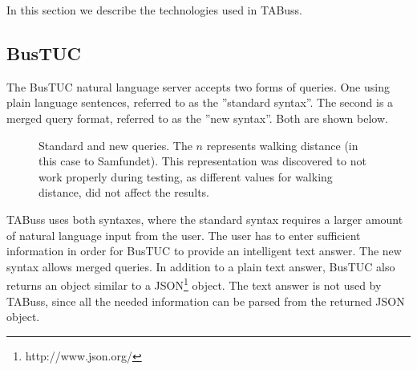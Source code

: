 In this section we describe the technologies used in TABuss.
\subsection{BusTUC}
\label{sec:bustuc}
The BusTUC natural language server accepts two forms of queries. One using plain language sentences, referred to as the ''standard syntax''. The second is a merged query format, referred to as the ''new syntax''. Both are shown below.
\begin{figure}
\begin{center}
\end{center}
\caption{Standard and new queries. The $n$ represents walking distance (in this case to Samfundet). This representation was discovered to not work properly during testing, as different values for walking distance, did not affect the results.}
\end{figure}

TABuss uses both syntaxes, where the standard syntax requires a larger amount of natural language input from the user. The user has to enter sufficient information in order for BusTUC to provide an intelligent text answer. The new syntax allows merged queries. In addition to a plain text answer, BusTUC also returns an object similar to a JSON\footnote{http://www.json.org/} object. The text answer is not used by TABuss, since all the needed information can be parsed from the returned JSON object. 



